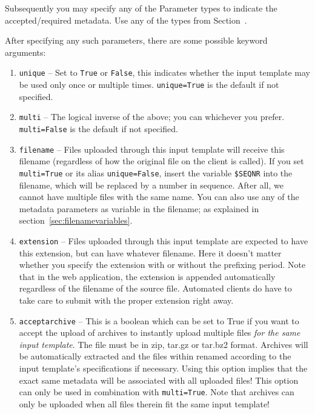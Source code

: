 \documentclass[a4paper,12pt]{report}
\begin{document}
Subsequently you may specify any of the Parameter types to indicate the accepted/required metadata. Use any of the types from Section~\label{sec:parameters}. 

After specifying any such parameters, there are some possible keyword arguments:

\begin{enumerate}
\item \texttt{unique} -- Set to \texttt{True} or \texttt{False}, this indicates whether the input template may be used only once or multiple times. \texttt{unique=True} is the default if not specified.
\item \texttt{multi} -- The logical inverse of the above; you can whichever you prefer. \texttt{multi=False} is the default if not specified.
\item \texttt{filename} -- Files uploaded through this input template will receive this filename (regardless of how the original file on the client is called). If you set \texttt{multi=True} or its alias \texttt{unique=False}, insert the variable \texttt{\$SEQNR} into the filename, which will be replaced by a number in sequence. After all, we cannot have multiple files with the same name. You can also use any of the metadata parameters as variable in the filename; as explained in section~\ref{sec:filenamevariables}.
\item \texttt{extension} -- Files uploaded through this input template are expected to have this extension, but can have whatever filename. Here it doesn't matter whether you specify the extension with or without the prefixing period. Note that in the web application, the extension is appended automatically regardless of the filename of the source file. Automated clients do have to take care to submit with the proper extension right away. 
\item \texttt{acceptarchive} -- This is a boolean which can be set to True if you want to accept the upload of archives to instantly upload multiple files \emph{for the same input template}. The file must be in zip, tar.gz or tar.bz2 format. Archives will be automatically extracted and the files within renamed according to the input template's specifications if necessary. Using this option implies that the exact same metadata will be associated with all uploaded files! This option can only be used in combination with \texttt{multi=True}. Note that archives can only be uploaded when all files therein fit the same input template!
\end{enumerate}
\end{document}
